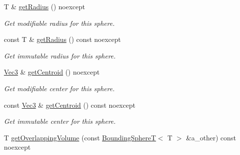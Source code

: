 \begin{DoxyCompactItemize}
T \& \hyperlink{classEBGeometry_1_1BoundingVolumes_1_1BoundingSphereT_a34a34d9da724336de6806ff607aed061}{get\+Radius} () noexcept
\begin{DoxyCompactList}\small\item\em Get modifiable radius for this sphere. \end{DoxyCompactList}\item 
\mbox{\label{classEBGeometry_1_1BoundingVolumes_1_1BoundingSphereT_a4ddb47370d9b627250e64cd437d26c37}} 
const T \& \hyperlink{classEBGeometry_1_1BoundingVolumes_1_1BoundingSphereT_a4ddb47370d9b627250e64cd437d26c37}{get\+Radius} () const noexcept
\begin{DoxyCompactList}\small\item\em Get immutable radius for this sphere. \end{DoxyCompactList}\item 
\mbox{\label{classEBGeometry_1_1BoundingVolumes_1_1BoundingSphereT_a7961a0ee3e60fd5359ba06f481c53351}} 
\hyperlink{classEBGeometry_1_1BoundingVolumes_1_1BoundingSphereT_a65cef119542a4c7c1cabb1ea36f40336}{Vec3} \& \hyperlink{classEBGeometry_1_1BoundingVolumes_1_1BoundingSphereT_a7961a0ee3e60fd5359ba06f481c53351}{get\+Centroid} () noexcept
\begin{DoxyCompactList}\small\item\em Get modifiable center for this sphere. \end{DoxyCompactList}\item 
\mbox{\label{classEBGeometry_1_1BoundingVolumes_1_1BoundingSphereT_a461a4f71837537ad801d11d394cff413}} 
const \hyperlink{classEBGeometry_1_1BoundingVolumes_1_1BoundingSphereT_a65cef119542a4c7c1cabb1ea36f40336}{Vec3} \& \hyperlink{classEBGeometry_1_1BoundingVolumes_1_1BoundingSphereT_a461a4f71837537ad801d11d394cff413}{get\+Centroid} () const noexcept
\begin{DoxyCompactList}\small\item\em Get immutable center for this sphere. \end{DoxyCompactList}\item 
T \hyperlink{classEBGeometry_1_1BoundingVolumes_1_1BoundingSphereT_aac6c4e803bf7eb25123d17eede0555a2}{get\+Overlapping\+Volume} (const \hyperlink{classEBGeometry_1_1BoundingVolumes_1_1BoundingSphereT}{Bounding\+SphereT}$<$ T $>$ \&a\+\_\+other) const noexcept

\end{DoxyCompactItemize}
